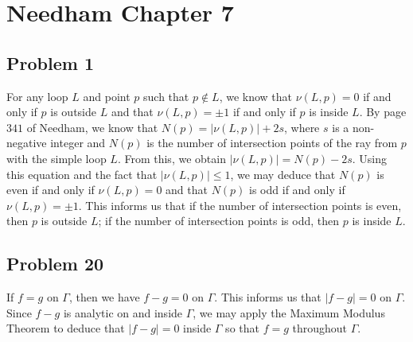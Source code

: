 \documentclass[12pt]{article}
\begin{document}
\section*{Needham Chapter 7}
\subsection*{Problem 1}
For any loop $L$ and point $p$ such that $p \not \in L$, we know that $\nu(L,p) = 0$ if and only if $p$ is outside $L$ and that $\nu(L,p) = \pm 1$ if and only if $p$ is inside $L$. By page $341$ of Needham, we know that $N(p) = \vert\nu(L,p)\vert + 2s$, where $s$ is a non-negative integer and $N(p)$ is the number of intersection points of the ray from $p$ with the simple loop $L$. From this, we obtain $\vert \nu(L,p) \vert = N(p) - 2s$. Using this equation and the fact that $\vert \nu(L,p)\vert \leq 1$, we may deduce that $N(p)$ is even if and only if $\nu(L,p) = 0$ and that $N(p)$ is odd if and only if $\nu(L,p) = \pm 1$. This informs us that if the number of intersection points is even, then $p$ is outside $L$; if the number of intersection points is odd, then $p$ is inside $L$.
\newpage
\subsection*{Problem 20}
If $f = g$ on $\Gamma$, then we have $f - g = 0$ on $\Gamma$. This informs us that $\vert f - g \vert = 0$ on $\Gamma$. Since $f - g$ is analytic on and inside $\Gamma$, we may apply the Maximum Modulus Theorem to deduce that $\vert f - g \vert = 0$ inside $\Gamma$ so that $f = g$ throughout $\Gamma$.
\end{document}
